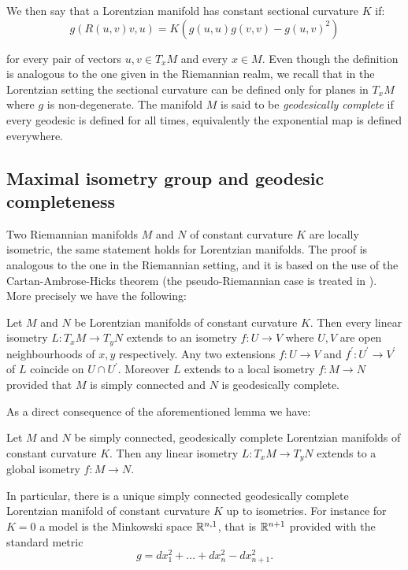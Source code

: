 \noindent We then say that a Lorentzian manifold has constant sectional curvature $K$ if: 
\begin{equation}\label{sectionalcurvature}
    g(R(u,v)v,u)=K(g(u,u)g(v,v)-g(u,v)^2) 
\end{equation}
    


for every pair of vectors $u,v \in T_{x}M$ and every $x\in M$. Even though the definition is analogous to the one given in the Riemannian realm, we recall that in the Lorentzian setting the sectional curvature can be defined only for planes in $T_{x}M$ where $g$ is non-degenerate. The manifold $M$ is said to be \textit{geodesically complete} if every geodesic is defined for all times, equivalently the exponential map is defined everywhere.\\

\subsection{Maximal isometry group and geodesic completeness} Two Riemannian manifolds $M$ and $N$ of constant curvature $K$ are locally isometric, the same statement holds for Lorentzian manifolds. The proof is analogous to the one in the Riemannian setting, and it is based on the use of the Cartan-Ambrose-Hicks theorem (the pseudo-Riemannian case is treated in \cite{piccione2005single}). More precisely we have the following:

\begin{lemma}\label{isometrie} Let $M$ and $N$ be Lorentzian manifolds of constant curvature $K$. Then every linear isometry $L:T_{x}M\to T_yN$ extends to an isometry $f:U\to V$ where $U, V$ are open neighbourhoods of $x, y$ respectively. Any two extensions $f:U\to V$ and $f^{\prime}:U^{\prime} \to V^{\prime} $ of $L$ coincide on $U\cap U^{\prime}. $ Moreover $L$ extends to a local isometry $f:M\to N$ provided that $M$ is simply connected and $N$ is geodesically complete. 
\end{lemma}

As a direct consequence of the aforementioned lemma we have: 
\begin{corollary}\label{122}
    Let $M$ and $N$ be simply connected, geodesically complete Lorentzian manifolds of constant curvature $K$. Then any linear isometry $L:T_xM\to T_yN$ extends to a global isometry $f:M\to N.$   
\end{corollary}

In particular, there is a unique simply connected geodesically complete Lorentzian manifold of constant curvature $K$ up to isometries. For instance for $K=0$ a model is the Minkowski space $\mathbb{R}^{n,1}$, that is $\mathbb{R}^{n+1}$ provided with the standard metric
\[
    g=dx_1^{2}+\dots+dx_n^{2}-dx_{n+1}^2.   
\]

